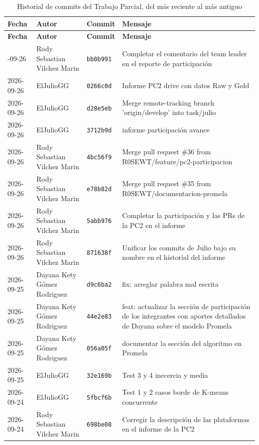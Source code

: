 {\small
\begin{xltabular}{\textwidth}{@{}L{2cm}L{2.9cm}L{1.5cm}Y@{}}
\caption{Historial de commits del Trabajo Parcial, del más reciente al más antiguo}\label{tab:commits}\\
\toprule
\textbf{Fecha} & \textbf{Autor} & \textbf{Commit} & \textbf{Mensaje} \\
\midrule
\endfirsthead
\toprule
\textbf{Fecha} & \textbf{Autor} & \textbf{Commit} & \textbf{Mensaje} \\
\midrule
\endhead
\bottomrule
{}-09-26 & Rody Sebastian Vilchez Marin & \texttt{bb0b991} & Completar el comentario del team leader en el reporte de participación \\
2026-09-26 & ElJulioGG & \texttt{0266c0d} & Informe PC2 drive con datos Raw y Gold \\
2026-09-26 & ElJulioGG & \texttt{d28e5eb} & Merge remote-tracking branch 'origin/develop' into task/julio \\
2026-09-26 & ElJulioGG & \texttt{3712b9d} & informe participación avance \\
2026-09-26 & Rody Sebastian Vilchez Marin & \texttt{4bc56f9} & Merge pull request \#36 from R0SEWT/feature/pc2-participacion \\
2026-09-26 & Rody Sebastian Vilchez Marin & \texttt{e78b82d} & Merge pull request \#35 from R0SEWT/documentacion-promela \\
2026-09-26 & Rody Sebastian Vilchez Marin & \texttt{5abb976} & Completar la participación y las PRs de la PC2 en el informe \\
2026-09-26 & Rody Sebastian Vilchez Marin & \texttt{871638f} & Unificar los commits de Julio bajo su nombre en el historial del informe \\
2026-09-25 & Dayana Kety Gómez Rodriguez & \texttt{d9c6ba2} & fix: arreglar palabra mal escrita \\
2026-09-25 & Dayana Kety Gómez Rodriguez & \texttt{44e2e83} & feat: actualizar la sección de participación de los integrantes con aportes detallados de Dayana sobre el modelo Promela \\
2026-09-25 & Dayana Kety Gómez Rodriguez & \texttt{056a05f} & documentar la sección del algoritmo en Promela \\
2026-09-25 & ElJulioGG & \texttt{32e169b} & Test 3 y 4 inecercia y media \\
2026-09-24 & ElJulioGG & \texttt{5fbcf6b} & Test 1 y 2 casos borde de K-means concurrente \\
2026-09-24 & Rody Sebastian Vilchez Marin & \texttt{698be08} & Corregir la descripción de las plataformas en el informe de la PC2 \\

\end{xltabular}}
